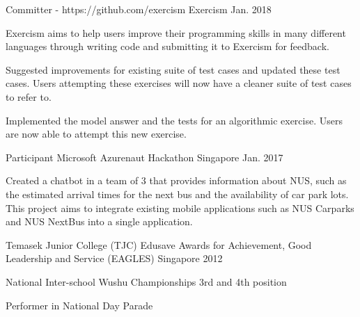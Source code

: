 

\begin{cventries}


  \cventry
    {Committer - https://github.com/exercism} %
    {Exercism} %
    {} %
    {Jan. 2018} %
    {
      \begin{cvitems} %
        \item {Exercism aims to help users improve their programming skills in many different languages through writing code and submitting it to Exercism for feedback.}
        \item {Suggested improvements for existing suite of test cases and updated these test cases. Users attempting these exercises will now have a cleaner suite of test cases to refer to.}
        \item {Implemented the model answer and the tests for an algorithmic exercise. Users are now able to attempt this new exercise.}
      \end{cvitems}
    }

  \cventry
    {Participant} %
    {Microsoft Azurenaut Hackathon} %
    {Singapore} %
    {Jan. 2017} %
    {
      \begin{cvitems} %
        \item {Created a chatbot in a team of 3 that provides information about NUS, such as the estimated arrival times for the next bus and the availability of car park lots. This project aims to integrate existing mobile applications such as NUS Carparks and NUS NextBus into a single application.}
      \end{cvitems}
    }
    
  \cventry
    {Temasek Junior College (TJC)} %
    {Edusave Awards for Achievement, Good Leadership and Service (EAGLES)} %
    {Singapore} %
    {2012} %
    {
      \begin{cvitems} %
        \item {National Inter-school Wushu Championships 3rd and 4th position}
        \item {Performer in National Day Parade}
      \end{cvitems}
    }

\end{cventries}
